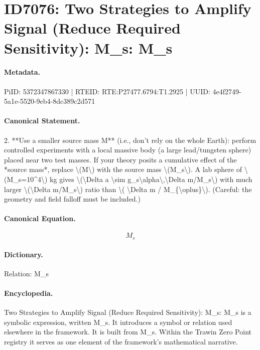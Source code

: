 \section*{ID7076: Two Strategies to Amplify Signal (Reduce Required Sensitivity): M\_s: M\_s}
\paragraph{Metadata.}
PiID: 5372347867330 | RTEID: RTE:P27477.6794:T1.2925 | UUID: 4e4f2749-5a1e-5520-9eb4-8dc389c2d571

\paragraph{Canonical Statement.}
2. **Use a smaller source mass M** (i.e., don’t rely on the whole Earth): perform controlled experiments with a local massive body (a large lead/tungsten sphere) placed near two test masses. If your theory posits a cumulative effect of the *source mass*, replace \textbackslash{}(M\textbackslash{}) with the source mass \textbackslash{}(M\_s\textbackslash{}). A lab sphere of \textbackslash{}(M\_s=10\textasciicircum{}4\textbackslash{}) kg gives \textbackslash{}(\textbackslash{}Delta a \textbackslash{}sim g\_s\textbackslash{}alpha\textbackslash{},\textbackslash{}Delta m/M\_s\textbackslash{}) with much larger \textbackslash{}(\textbackslash{}Delta m/M\_s\textbackslash{}) ratio than \textbackslash{}( \textbackslash{}Delta m / M\_\{\textbackslash{}oplus\}\textbackslash{}). (Careful: the geometry and field falloff must be included.)

\paragraph{Canonical Equation.}
\[
M_s
\]

\paragraph{Dictionary.}
Relation: M\_s

\paragraph{Encyclopedia.}
Two Strategies to Amplify Signal (Reduce Required Sensitivity): M\_s: M\_s is a symbolic expression, written M\_s. It introduces a symbol or relation used elsewhere in the framework. It is built from M\_s. Within the Trawin Zero Point registry it serves as one element of the framework's mathematical narrative.
